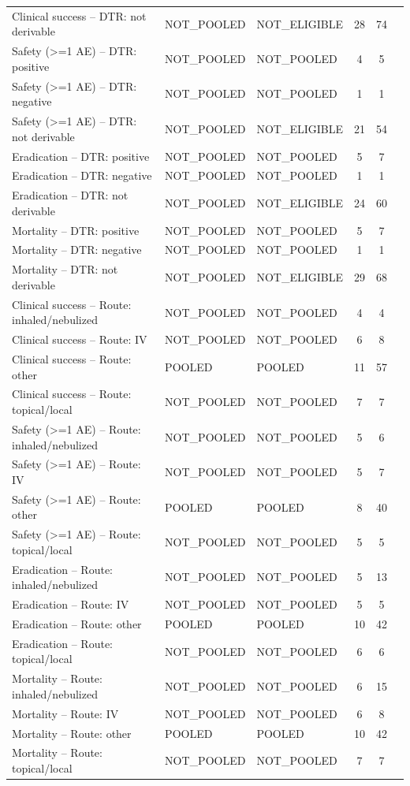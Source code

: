 \begin{tabular}{lllccl}
Clinical success -- DTR: not derivable & NOT\_POOLED & NOT\_ELIGIBLE & 28 & 74 &  \\
Safety (>=1 AE) -- DTR: positive & NOT\_POOLED & NOT\_POOLED & 4 & 5 &  \\
Safety (>=1 AE) -- DTR: negative & NOT\_POOLED & NOT\_POOLED & 1 & 1 &  \\
Safety (>=1 AE) -- DTR: not derivable & NOT\_POOLED & NOT\_ELIGIBLE & 21 & 54 &  \\
Eradication -- DTR: positive & NOT\_POOLED & NOT\_POOLED & 5 & 7 &  \\
Eradication -- DTR: negative & NOT\_POOLED & NOT\_POOLED & 1 & 1 &  \\
Eradication -- DTR: not derivable & NOT\_POOLED & NOT\_ELIGIBLE & 24 & 60 &  \\
Mortality -- DTR: positive & NOT\_POOLED & NOT\_POOLED & 5 & 7 &  \\
Mortality -- DTR: negative & NOT\_POOLED & NOT\_POOLED & 1 & 1 &  \\
Mortality -- DTR: not derivable & NOT\_POOLED & NOT\_ELIGIBLE & 29 & 68 &  \\
Clinical success -- Route: inhaled/nebulized & NOT\_POOLED & NOT\_POOLED & 4 & 4 &  \\
Clinical success -- Route: IV & NOT\_POOLED & NOT\_POOLED & 6 & 8 &  \\
Clinical success -- Route: other & POOLED & POOLED & 11 & 57 &  \\
Clinical success -- Route: topical/local & NOT\_POOLED & NOT\_POOLED & 7 & 7 &  \\
Safety (>=1 AE) -- Route: inhaled/nebulized & NOT\_POOLED & NOT\_POOLED & 5 & 6 &  \\
Safety (>=1 AE) -- Route: IV & NOT\_POOLED & NOT\_POOLED & 5 & 7 &  \\
Safety (>=1 AE) -- Route: other & POOLED & POOLED & 8 & 40 &  \\
Safety (>=1 AE) -- Route: topical/local & NOT\_POOLED & NOT\_POOLED & 5 & 5 &  \\
Eradication -- Route: inhaled/nebulized & NOT\_POOLED & NOT\_POOLED & 5 & 13 &  \\
Eradication -- Route: IV & NOT\_POOLED & NOT\_POOLED & 5 & 5 &  \\
Eradication -- Route: other & POOLED & POOLED & 10 & 42 &  \\
Eradication -- Route: topical/local & NOT\_POOLED & NOT\_POOLED & 6 & 6 &  \\
Mortality -- Route: inhaled/nebulized & NOT\_POOLED & NOT\_POOLED & 6 & 15 &  \\
Mortality -- Route: IV & NOT\_POOLED & NOT\_POOLED & 6 & 8 &  \\
Mortality -- Route: other & POOLED & POOLED & 10 & 42 &  \\
Mortality -- Route: topical/local & NOT\_POOLED & NOT\_POOLED & 7 & 7 &  \\
\bottomrule
\end{tabular}
